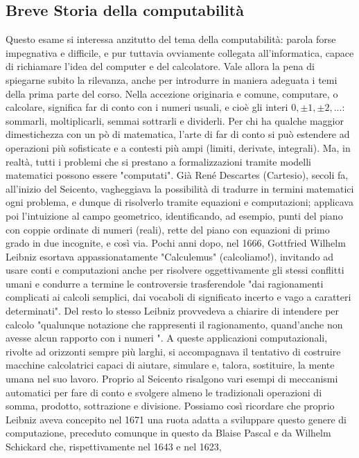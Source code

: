 \subsection{Breve Storia della computabilità}

Questo esame si interessa anzitutto del tema della computabilità: parola forse impegnativa e difficile, e pur tuttavia ovviamente collegata all'informatica, capace di
richiamare l'idea del computer e del calcolatore.
Vale allora la pena di spiegarne subito la rilevanza, anche per introdurre in maniera adeguata i temi della prima parte del corso.
Nella accezione originaria e comune, computare, o calcolare, significa far di conto con i numeri usuali, e cioè gli interi $0, \pm 1, \pm 2, ...$:
sommarli, moltiplicarli, semmai sottrarli e dividerli. Per chi ha qualche maggior dimestichezza con un pò
di matematica, l'arte di far di conto si può estendere ad operazioni più sofisticate e a contesti più ampi (limiti, derivate, integrali). Ma, in realtà, tutti i problemi
che si prestano a formalizzazioni tramite modelli matematici possono essere "computati".
Già René Descartes (Cartesio), secoli fa, all'inizio del Seicento, vagheggiava la possibilità di tradurre in termini matematici ogni problema, e dunque di risolverlo
tramite equazioni e computazioni; applicava poi l'intuizione al campo geometrico, identificando, ad esempio, punti del piano con coppie ordinate
di numeri (reali), rette del piano con equazioni di primo grado in due incognite, e così via.
Pochi anni dopo, nel 1666, Gottfried Wilhelm Leibniz esortava appassionatamente "Calculemus" (calcoliamo!), invitando ad usare conti e computazioni
anche per risolvere oggettivamente gli stessi conflitti umani e condurre a termine le controversie trasferendole "dai ragionamenti complicati ai calcoli semplici, dai
vocaboli di significato incerto e vago a caratteri determinati". Del resto lo stesso Leibniz provvedeva a chiarire di intendere per calcolo
"qualunque notazione che rappresenti il ragionamento, quand'anche non avesse alcun rapporto con i numeri ".
A queste applicazioni computazionali, rivolte ad orizzonti sempre più larghi, si accompagnava il tentativo di costruire macchine calcolatrici capaci di aiutare,
simulare e, talora, sostituire, la mente umana nel suo lavoro. Proprio al Seicento risalgono vari esempi di meccanismi automatici per fare di conto e svolgere almeno
le tradizionali operazioni di somma, prodotto, sottrazione e divisione. Possiamo così ricordare che proprio Leibniz aveva concepito nel 1671 una ruota adatta
a sviluppare questo genere di computazione, preceduto comunque in questo da Blaise Pascal e da Wilhelm Schickard che, rispettivamente nel 1643 e nel 1623,
